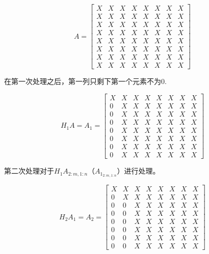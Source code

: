 


$$ A=\left[\begin{array}{llllllll}X & X & X & X & X & X & X & X \\ X & X & X & X & X & X & X & X \\ X & X & X & X & X & X & X & X \\ X & X & X & X & X & X & X & X \\ X & X & X & X & X & X & X & X \\ X & X & X & X & X & X & X & X \\ X & X & X & X & X & X & X & X \\ X & X & X & X & X & X & X & X\end{array}\right] $$

在第一次处理之后，第一列只剩下第一个元素不为0.

$$H_1A = A_{1}=\left[\begin{array}{llllllll}X & X & X & X & X & X & X & X \\ 0 & X & X & X & X & X & X & X \\ 0 & X & X & X & X & X & X & X \\ 0 & X & X & X & X & X & X & X \\ 0 & X & X & X & X & X & X & X \\ 0 & X & X & X & X & X & X & X \\ 0 & X & X & X & X & X & X & X \\ 0 & X & X & X & X & X & X & X\end{array}\right] $$

第二次处理对于$H_1A_{2:m, 1:n}$（$A_{1_{2:m, 1:n} }  $）进行处理。

$$H_2A_1= A_{2}=\left[\begin{array}{cccccccc}X & X & X & X & X & X & X & X \\ 0 & X & X & X & X & X & X & X \\ 0 & 0 & X & X & X & X & X & X \\ 0 & 0 & X & X & X & X & X & X \\ 0 & 0 & X & X & X & X & X & X \\ 0 & 0 & X & X & X & X & X & X \\ 0 & 0 & X & X & X & X & X & X \\ 0 & 0 & X & X & X & X & X & X\end{array}\right] $$

